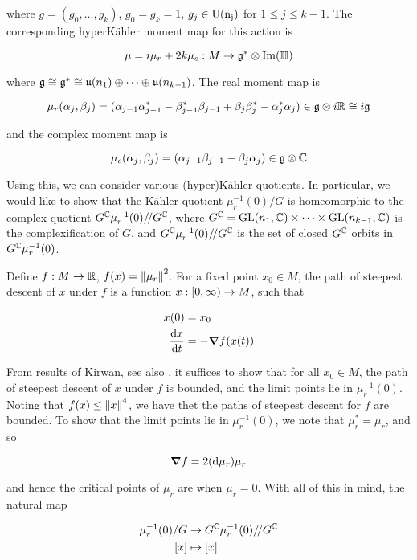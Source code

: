 \documentclass{article}
\newcommand{\sslash}{/\!/}
\begin{document}
where \(g = (g_0, \dots, g_k)\), \(g_0 = g_k = 1\), \(g_j \in \rm U(n_j)\) for \(1 \le j \le k-1\). The corresponding hyperK\"ahler moment map for this action is

\[\mu = i\mu_r + 2k\mu_c : M \to \mathfrak{g}^* \otimes \Im(\mathbb{H})\]

where \(\mathfrak{g} \cong \mathfrak{g}^* \cong \mathfrak{u}(n_1) \oplus \cdots \oplus \mathfrak{u}(n_{k-1})\). The real moment map is

\[\mu_r(\alpha_j, \beta_j) = (\alpha_{j-1}\alpha_{j-1}^* - \beta_{j-1}^*\beta_{j-1} + \beta_j\beta_j^* - \alpha_j^*\alpha_j) \in \mathfrak{g} \otimes i\mathbb{R} \cong i\mathfrak{g}\]

and the complex moment map is

\[\mu_c(\alpha_j, \beta_j) = (\alpha_{j-1}\beta_{j-1} - \beta_j\alpha_j) \in \mathfrak{g} \otimes \mathbb{C}\]

Using this, we can consider various (hyper)K\"ahler quotients. In particular, we would like to show that the K\"ahler quotient \(\mu_r^{-1}(0)/G\) is homeomorphic to the complex quotient \(G^\C\mu_r^{-1}(0)\sslash G^\C\), where \(G^{\mathbb{C}} = \operatorname{GL}(n_1, \mathbb{C}) \times \cdots \times \operatorname{GL}(n_{k-1}, \mathbb{C})\) is the complexification of \(G\), and \(G^\C\mu_r^{-1}(0)\sslash G^\C\) is the set of closed \(G^{\mathbb{C}}\) orbits in \(G^{\mathbb{C}}\mu_r^{-1}(0)\).

Define \(f : M \to \mathbb{R}\), \(f(x) = \norm{\mu_r}^2\). For a fixed point \(x_0 \in M\), the path of steepest descent of \(x\) under \(f\) is a function \(x : [0, \infty) \to M\), such that

\begin{align*}
    x(0) &= x_0 \\
    \dv{x}{t} &= -\grad f(x(t))
\end{align*}

From results of Kirwan\cite{kirwan}, see also \cite[Theorem 2.2]{kobak_classical_1996}, it suffices to show that for all \(x_0 \in M\), the path of steepest descent of \(x\) under \(f\) is bounded, and the limit points lie in \(\mu_r^{-1}(0)\). Noting that \(f(x) \le \norm{x}^4\), we have thet the paths of steepest descent for \(f\) are bounded. To show that the limit points lie in \(\mu_r^{-1}(0)\), we note that \(\mu_r^* = \mu_r\), and so 

\[\grad f = 2(\dd\mu_r)\mu_r\]

and hence the critical points of \(\mu_r\) are when \(\mu_r = 0\). With all of this in mind, the natural map

\begin{align*}
    \mu_r^{-1}(0)/G &\to G^\C\mu_r^{-1}(0)\sslash G^\C \\
    [x] &\mapsto [x]
\end{align*}
\end{document}
